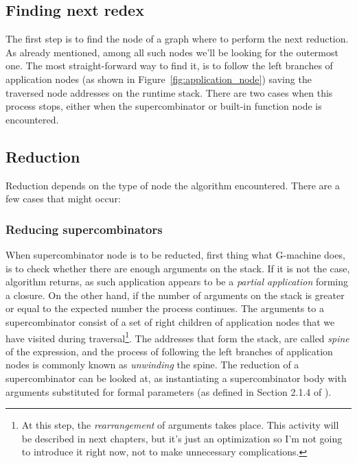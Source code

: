 \documentclass[12pt,a4paper]{report}
\begin{document}
\subsection{Finding next redex}
The first step is to find the node of a graph where to perform the next
reduction. As already mentioned, among all such nodes we'll be looking for the
outermost one. The most straight-forward way to find it, is to follow the left
branches of application nodes (as shown in Figure~\ref{fig:application_node})
saving the traversed node addresses on the runtime stack. There are two cases
when this process stops, either when the supercombinator or built-in function
node is encountered.

\subsection{Reduction}
Reduction depends on the type of node the algorithm encountered. There are a
few cases that might occur:

\subsubsection{Reducing supercombinators}
When supercombinator node is to be reducted, first thing what G-machine does,
is to check whether there are enough arguments on the stack. If it is not the
case, algorithm returns, as such application appears to be a \textit{partial
application} forming a closure. On the other hand, if the number of arguments
on the stack is greater or equal to the expected number the process continues.
The arguments to a supercombinator consist of a set of right children of
application nodes that we have visited during traversal\footnote{At this step,
the \textit{rearrangement} of arguments takes place. This activity will be
described in next chapters, but it's just an optimization so I'm not going to
introduce it right now, not to make unnecessary complications.}. The addresses
that form the stack, are called \textit{spine} of the expression, and the
process of following the left branches of application nodes is commonly known
as \textit{unwinding} the spine. The reduction of a supercombinator can be
looked at, as instantiating a supercombinator body with arguments substituted
for formal parameters (as defined in Section 2.1.4 of \cite{JonLes00}).
\end{document}
